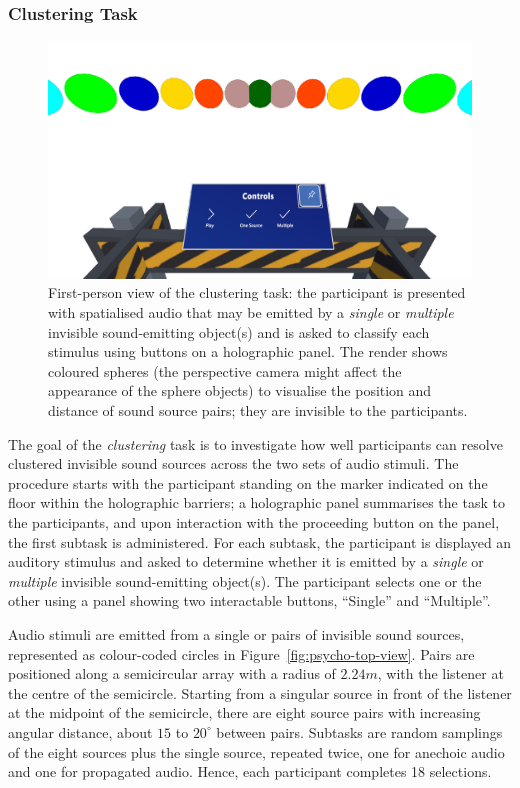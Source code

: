\subsubsection{Clustering Task}
\begin{figure}[htbp]
    \centering
    \includegraphics[width=1\columnwidth]{7_evaluation/images/clustering-fpv.png}
    \caption{First-person view of the clustering task: the participant is presented with spatialised audio that may be emitted by a \emph{single} or \emph{multiple} invisible sound-emitting object(s) and is asked to classify each stimulus using buttons on a holographic panel. The render shows coloured spheres (the perspective camera might affect the appearance of the sphere objects) to visualise the position and distance of sound source pairs; they are invisible to the participants.}
    \label{fig:clustering-fpv}
\end{figure}
The goal of the \emph{clustering} task is to investigate how well participants can resolve clustered invisible sound sources across the two sets of audio stimuli. The procedure starts with the participant standing on the marker indicated on the floor within the holographic barriers; a holographic panel summarises the task to the participants, and upon interaction with the proceeding button on the panel, the first subtask is administered. For each subtask, the participant is displayed an auditory stimulus and asked to determine whether it is emitted by a \emph{single} or \emph{multiple} invisible sound-emitting object(s). The participant selects one or the other using a panel showing two interactable buttons, ``Single'' and ``Multiple''. \par
Audio stimuli are emitted from a single or pairs of invisible sound sources, represented as colour-coded circles in Figure~\ref{fig:psycho-top-view}. Pairs are positioned along a semicircular array with a radius of $2.24m$, with the listener at the centre of the semicircle. Starting from a singular source in front of the listener at the midpoint of the semicircle, there are eight source pairs with increasing angular distance, about $15$ to $20^\circ$ between pairs. Subtasks are random samplings of the eight sources plus the single source, repeated twice, one for anechoic audio and one for propagated audio. Hence, each participant completes 18 selections. \par


